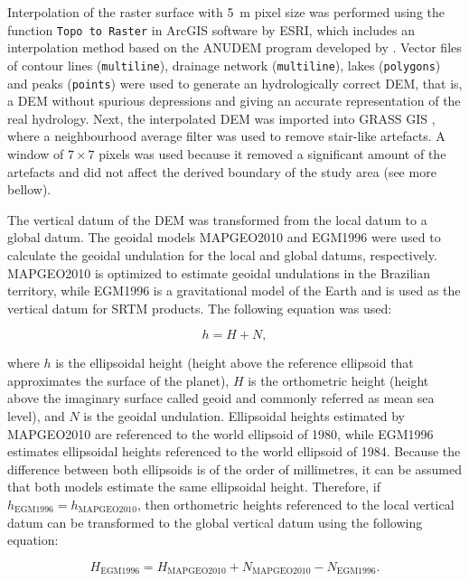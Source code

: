 Interpolation of the raster surface with \SI{5}{\metre} pixel size was performed using the function 
\texttt{Topo to Raster} in ArcGIS\textregistered{} software by ESRI, which includes an interpolation 
method based on the ANUDEM program developed by . Vector files of contour 
lines (\texttt{multiline}), drainage network (\texttt{multiline}), lakes (\texttt{polygons}) and 
peaks (\texttt{points}) were used to generate an hydrologically correct DEM, that is, a DEM without 
spurious depressions and giving an accurate representation of the real hydrology. Next, the 
interpolated DEM was imported into GRASS GIS \cite{GRASS2012}, where a neighbourhood average filter 
was used to remove stair-like artefacts. A window of $7 \times 7$ pixels was used because it 
removed a significant amount of the artefacts and did not affect the derived boundary of the study 
area (see more bellow).

The vertical datum of the DEM was transformed from the local datum to a global datum. The geoidal 
models MAPGEO2010 \cite{IBGE2010a} and EGM1996 \cite{LemoineEtAl1998} were used to calculate the 
geoidal undulation for the local and global datums, respectively. MAPGEO2010 is optimized to 
estimate geoidal undulations in the Brazilian territory, while EGM1996 is a gravitational model of 
the Earth and is used as the vertical datum for SRTM products. The following equation was used:

\begin{equation}
 h = H + N,
\end{equation}

\noindent where $h$ is the ellipsoidal height (height above the reference ellipsoid that 
approximates the surface of the planet), $H$ is the orthometric height (height above the imaginary 
surface called geoid and commonly referred as mean sea level), and $N$ is the geoidal undulation. 
Ellipsoidal heights estimated by MAPGEO2010 are referenced to the world ellipsoid of 1980, while 
EGM1996 estimates ellipsoidal heights referenced to the world ellipsoid of 1984. Because the 
difference between both ellipsoids is of the order of millimetres, it can be assumed that both 
models estimate the same ellipsoidal height. Therefore, if 
$h_{\text{EGM1996}} = h_{\text{MAPGEO2010}}$, then orthometric heights referenced to the local 
vertical datum can be transformed to the global vertical datum using the following equation:

\begin{equation}
 H_{\text{EGM1996}} = H_{\text{MAPGEO2010}} + N_{\text{MAPGEO2010}} - N_{\text{EGM1996}}.
\end{equation}\label{eqn:geoidal}

